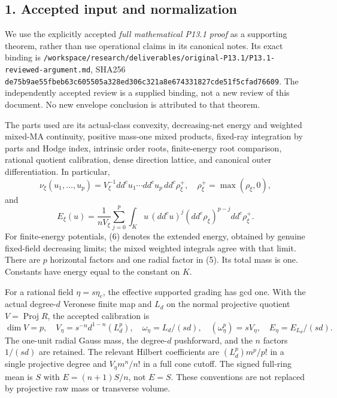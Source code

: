 \documentclass[
  10pt,
]{article}
\begin{document}
\subsection{1. Accepted input and
normalization}\label{accepted-input-and-normalization}

We use the explicitly accepted \emph{full mathematical P13.1 proof} as a
supporting theorem, rather than use operational claims in its canonical
notes. Its exact binding is
\nolinkurl{/workspace/research/deliverables/original-P13.1/P13.1-reviewed-argument.md},
SHA256
\nolinkurl{de75b9ae55fbeb63c605505a328ed306c321a8e674331827cde51f5cfad76609}.
The independently accepted review is a supplied binding, not a new
review of this document. No new envelope conclusion is attributed to
that theorem.

The parts used are its actual-class convexity, decreasing-net energy and
weighted mixed-MA continuity, positive mass-one mixed products,
fixed-ray integration by parts and Hodge index, intrinsic order roots,
finite-energy root comparison, rational quotient calibration, dense
direction lattice, and canonical outer differentiation. In particular,
\[
 \nu_\xi(u_1,\ldots,u_p)
   =V_\xi^{-1}dd^cu_1\cdots dd^cu_p\,dd^c\rho_\xi^+,
 \quad \rho_\xi^+=\max(\rho_\xi,0),                                    \tag{5}
\] and \[
 E_\xi(u)=\frac1{nV_\xi}\sum_{j=0}^p
       \int_Ku\,(dd^cu)^j(dd^c\rho_\xi)^{p-j}dd^c\rho_\xi^+.             \tag{6}
\] For finite-energy potentials, (6) denotes the extended energy,
obtained by genuine fixed-field decreasing limits; the mixed weighted
integrals agree with that limit. There are \(p\) horizontal factors and
one radial factor in (5). Its total mass is one. Constants have energy
equal to the constant on \(K\).

For a rational field \(\eta=s\eta_e\), the effective supported grading
has gcd one. With the actual degree-\(d\) Veronese finite map and
\(L_d\) on the normal projective quotient \(V=\operatorname{Proj}R\),
the accepted calibration is \[
 \dim V=p,
 \quad V_\eta=s^{-n}d^{1-n}(L_d^p),
 \quad\omega_\eta=L_d/(sd),\quad (\omega_\eta^p)=sV_\eta,
 \quad E_\eta=E_{L_d}/(sd).                                           \tag{7}
\] The one-unit radial Gauss mass, the degree-\(d\) pushforward, and the
\(n\) factors \(1/(sd)\) are retained. The relevant Hilbert coefficients
are \((L_d^p)m^p/p!\) in a single projective degree and
\(V_\eta m^n/n!\) in a full cone cutoff. The signed full-ring mean is
\(S\) with \(E=(n+1)S/n\), not \(E=S\). These conventions are not
replaced by projective raw mass or transverse volume.
\end{document}
